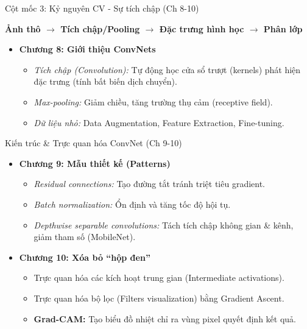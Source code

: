 \documentclass[aspectratio=169]{beamer}
\begin{document}
\begin{frame}{Cột mốc 3: Kỷ nguyên CV - Sự tích chập (Ch 8-10)}
    \begin{center}
        \textbf{Ảnh thô $\rightarrow$ Tích chập/Pooling $\rightarrow$ Đặc trưng hình học $\rightarrow$ Phân lớp}
    \end{center}
    \begin{itemize}
        \item \textbf{Chương 8: Giới thiệu ConvNets}
        \begin{itemize}
            \item \textit{Tích chập (Convolution):} Tự động học cửa sổ trượt (kernels) phát hiện đặc trưng (tính bất biến dịch chuyển).
            \item \textit{Max-pooling:} Giảm chiều, tăng trường thụ cảm (receptive field).
            \item \textit{Dữ liệu nhỏ:} Data Augmentation, Feature Extraction, Fine-tuning.
        \end{itemize}
    \end{itemize}
\end{frame}

\begin{frame}{Kiến trúc \& Trực quan hóa ConvNet (Ch 9-10)}
    \begin{itemize}
        \item \textbf{Chương 9: Mẫu thiết kế (Patterns)}
        \begin{itemize}
            \item \textit{Residual connections:} Tạo đường tắt tránh triệt tiêu gradient.
            \item \textit{Batch normalization:} Ổn định và tăng tốc độ hội tụ.
            \item \textit{Depthwise separable convolutions:} Tách tích chập không gian \& kênh, giảm tham số (MobileNet).
        \end{itemize}
        \item \textbf{Chương 10: Xóa bỏ ``hộp đen''}
        \begin{itemize}
            \item Trực quan hóa các kích hoạt trung gian (Intermediate activations).
            \item Trực quan hóa bộ lọc (Filters visualization) bằng Gradient Ascent.
            \item \textbf{Grad-CAM:} Tạo biểu đồ nhiệt chỉ ra vùng pixel quyết định kết quả.
        \end{itemize}
    \end{itemize}
\end{frame}
\end{document}
